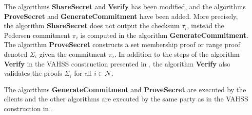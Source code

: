 The algorithms \textbf{ShareSecret} and \textbf{Verify} has been modified,  and the algorithms \textbf{ProveSecret} and \textbf{GenerateCommitment} have been added. More precisely, the algorithm \textbf{ShareSecret} does not output the checksum $\tau_i$, instead the Pedersen commitment $\pi_i$ is computed in the algorithm \textbf{GenerateCommitment}. The algorithm \textbf{ProveSecret} constructs a set membership proof or range proof denoted $\Sigma_i$ given the commitment $\pi_i$. 
 In addition to the steps of the algorithm \textbf{Verify} in the VAHSS construction presented in \cite{SumItUp}, the algorithm \textbf{Verify} also validates the proofs $\Sigma_i$ for all $i\in\mathcal{N}$.


The algorithms \textbf{GenerateCommitment} and \textbf{ProveSecret} are executed by the clients and the other algorithms are executed by the same party as in the  VAHSS construction in \cite{SumItUp}. 



